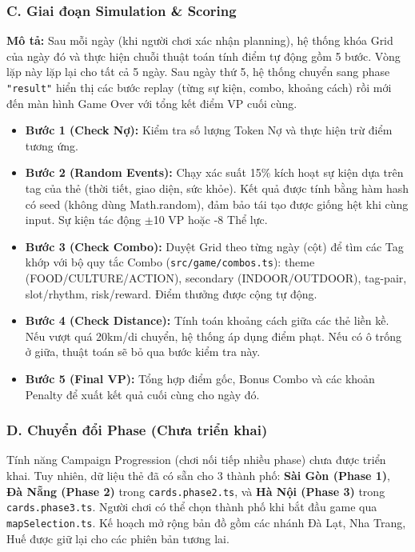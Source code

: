 \subsubsection{C. Giai đoạn Simulation \& Scoring}

\textbf{Mô tả:} Sau mỗi ngày (khi người chơi xác nhận planning), hệ thống khóa Grid của ngày đó và thực hiện chuỗi thuật toán tính điểm tự động gồm 5 bước. Vòng lặp này lặp lại cho tất cả 5 ngày. Sau ngày thứ 5, hệ thống chuyển sang phase \texttt{"result"} hiển thị các bước replay (từng sự kiện, combo, khoảng cách) rồi mới đến màn hình Game Over với tổng kết điểm VP cuối cùng.
    
\begin{itemize}[topsep=0pt, itemsep=2pt, leftmargin=1.2cm]

    \item \textbf{Bước 1 (Check Nợ):} Kiểm tra số lượng Token Nợ và thực hiện trừ điểm tương ứng.
    
    \item \textbf{Bước 2 (Random Events):} Chạy xác suất 15\% kích hoạt sự kiện dựa trên tag của thẻ (thời tiết, giao diện, sức khỏe). Kết quả được tính bằng hàm hash có seed (không dùng Math.random), đảm bảo tái tạo được giống hệt khi cùng input. Sự kiện tác động $\pm$10 VP hoặc -8 Thể lực.
    
    \item \textbf{Bước 3 (Check Combo):} Duyệt Grid theo từng ngày (cột) để tìm các Tag khớp với bộ quy tắc Combo (\texttt{src/game/combos.ts}): theme (FOOD/CULTURE/ACTION), secondary (INDOOR/OUTDOOR), tag-pair, slot/rhythm, risk/reward. Điểm thưởng được cộng tự động.
    
    \item \textbf{Bước 4 (Check Distance):} Tính toán khoảng cách giữa các thẻ liền kề. Nếu vượt quá 20km/di chuyển, hệ thống áp dụng điểm phạt. Nếu có ô trống ở giữa, thuật toán sẽ bỏ qua bước kiểm tra này.
    
    \item \textbf{Bước 5 (Final VP):} Tổng hợp điểm gốc, Bonus Combo và các khoản Penalty để xuất kết quả cuối cùng cho ngày đó.
    
\end{itemize}

\subsubsection{D. Chuyển đổi Phase (Chưa triển khai)}
    
Tính năng Campaign Progression (chơi nối tiếp nhiều phase) chưa được triển khai. Tuy nhiên, dữ liệu thẻ đã có sẵn cho 3 thành phố: \textbf{Sài Gòn (Phase 1)}, \textbf{Đà Nẵng (Phase 2)} trong \texttt{cards.phase2.ts}, và \textbf{Hà Nội (Phase 3)} trong \texttt{cards.phase3.ts}. Người chơi có thể chọn thành phố khi bắt đầu game qua \texttt{mapSelection.ts}. Kế hoạch mở rộng bản đồ gồm các nhánh Đà Lạt, Nha Trang, Huế được giữ lại cho các phiên bản tương lai.

